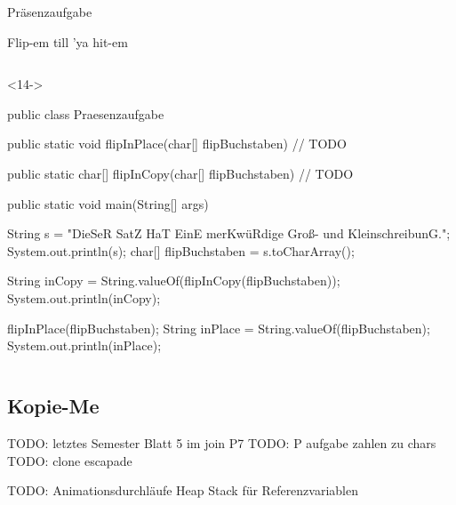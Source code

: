 {\begin{frame}[fragile,c]{Präsenzaufgabe}
\begin{aufgabe}{Flip-em till 'ya hit-em}
\begin{onlyenv}
\begin{columns}[onlytextwidth,c]
\begin{onlyenv}<14->
\begin{plainjava}
public class Praesenzaufgabe {
    public static void flipInPlace(char[] flipBuchstaben) {
        // TODO
    }

    public static char[] flipInCopy(char[] flipBuchstaben) {
        // TODO
    }

    public static void main(String[] args) {
        String s = "DieSeR SatZ HaT EinE merKwüRdige Groß- und KleinschreibunG.";
        System.out.println(s);
        char[] flipBuchstaben = s.toCharArray();

        String inCopy = String.valueOf(flipInCopy(flipBuchstaben));
        System.out.println(inCopy);

        flipInPlace(flipBuchstaben);
        String inPlace = String.valueOf(flipBuchstaben);
        System.out.println(inPlace);
    }
}
\end{plainjava}
\end{onlyenv}
\end{columns}
\end{onlyenv}
\end{aufgabe}
\end{frame}
}
\subsection{Kopie-Me}
\begin{frame}
    TODO: letztes Semester Blatt 5 im join P7
TODO: P aufgabe zahlen zu chars
TODO: clone escapade

TODO: Animationsdurchläufe Heap Stack für Referenzvariablen
\end{frame}



\iffull\fi
